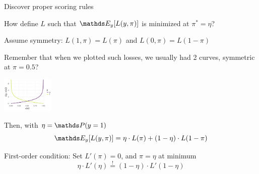 \documentclass[11pt,compress,t,notes=noshow, xcolor=table]{beamer}
\begin{document}
\begin{vbframe}{Discover proper scoring rules}

\begin{itemizeL}
    \item How define $L$ such that $\E_y[L(y, \pi)]$ is minimized at $\pi^{\ast}=\eta$? 

\item Assume symmetry: 
$L(1,\pi)=L(\pi)$ and $L(0,\pi)=L(1-\pi)$ \\

\item 
\begin{minipage}[t]{0.5\textwidth}
Remember that when we plotted such losses, we usually had 2 curves,
symmetric at $\pi=0.5$?
\end{minipage}
\hfill
\begin{minipage}[t]{0.4\textwidth}
\vspace{-0.1cm}
\begin{center}
\includegraphics[width=2.5cm]{figure/bernoulli_prob.png}
\end{center}
\end{minipage}
\item Then, with $\eta = \P(y = 1)$
$$\E_{y}[L(y, \pi)]=\eta \cdot L(\pi) + (1-\eta) \cdot L(1-\pi)$$
\item First-order condition: Set $L'(\pi) = 0$, and $\pi=\eta$ at minimum 
$$\eta \cdot L'(\eta) \overset{!}{=} (1-\eta) \cdot L'(1-\eta)$$
\end{itemizeL}

\end{vbframe}
\end{document}
